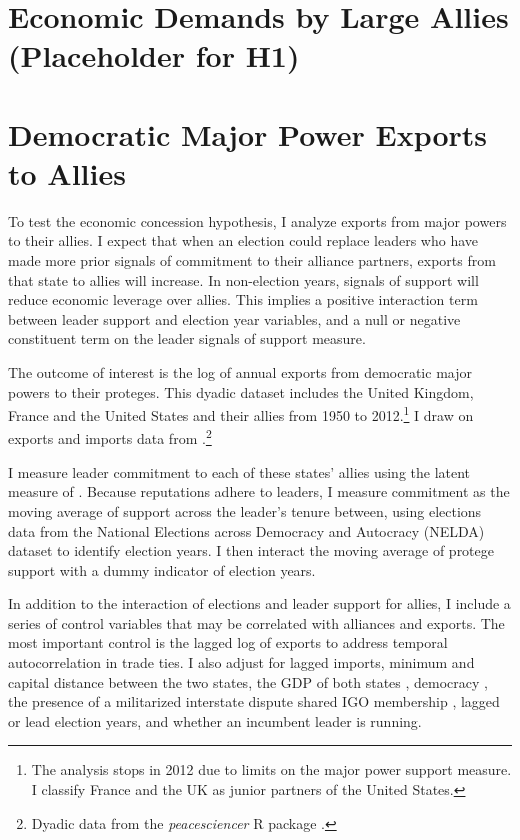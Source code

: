 \documentclass[12pt]{article}
\begin{document}
\section{Economic Demands by Large Allies (Placeholder for H1)}




\section{Democratic Major Power Exports to Allies}

To test the economic concession hypothesis, I analyze exports from major powers to their allies. 
I expect that when an election could replace leaders who have made more prior signals of commitment to their alliance partners, exports from that state to allies will increase. 
In non-election years, signals of support will reduce economic leverage over allies.
This implies a positive interaction term between leader support and election year variables, and a null or negative constituent term on the leader signals of support measure.


The outcome of interest is the log of annual exports from democratic major powers to their proteges. 
This dyadic dataset includes the United Kingdom, France and the United States and their allies from 1950 to 2012.\footnote{The analysis stops in 2012 due to limits on the major power support measure. I classify France and the UK as junior partners of the United States.}
I draw on exports and imports data from \citep{Barbierietal2009td}.\footnote{Dyadic data from the \textit{peacesciencer} \textsf{R} package \citep{peacesciencer-package}.}


I measure leader commitment to each of these states' allies using the latent measure of \citet{McManusNieman2019}.
Because reputations adhere to leaders, I measure commitment as the moving average of support across the leader's tenure between, using elections data from the National Elections across Democracy and Autocracy (NELDA) dataset \citep{HydeMarinov2012} to identify election years.
I then interact the moving average of protege support with a dummy indicator of election years. 


In addition to the interaction of elections and leader support for allies, I include a series of control variables that may be correlated with alliances and exports. 
The most important control is the lagged log of exports to address temporal autocorrelation in trade ties.
I also adjust for lagged imports, minimum and capital distance between the two states, the GDP of both states \citep{Andersetal2020}, democracy \citep{Marquez2016}, the presence of a militarized interstate dispute \citep{Gibleretal2016} shared IGO membership \citep{Pevehouseetal2020}, lagged or lead election years, and whether an incumbent leader is running. 
\end{document}
